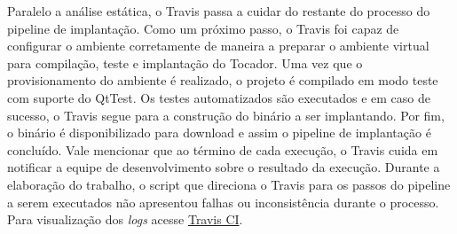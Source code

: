 Paralelo a análise estática, o Travis passa a cuidar do restante do processo do pipeline de implantação. Como um próximo passo, o Travis foi capaz de configurar o ambiente corretamente de maneira a preparar o ambiente virtual para compilação, teste e implantação do Tocador. Uma vez que o provisionamento do ambiente é realizado, o projeto é compilado em modo teste com suporte do QtTest. Os testes automatizados são executados e em caso de sucesso, o Travis segue para a construção do binário a ser implantando. Por fim, o binário é disponibilizado para download e assim o pipeline de implantação é concluído. Vale mencionar que ao término de cada execução, o Travis cuida em notificar a equipe de desenvolvimento sobre o resultado da execução. Durante a elaboração do trabalho, o script que direciona o Travis para os passos do pipeline a serem executados não apresentou falhas ou inconsistência durante o processo. Para visualização dos \textit{logs} acesse \href{https://travis-ci.org/BryanFernandes/player_rab-ogg/}{Travis CI}.


